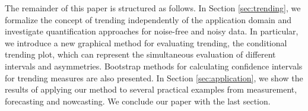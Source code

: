 The remainder of this paper is structured as follows. 
In Section \ref{sec:trending}, we formalize the concept of trending independently of the application domain and investigate quantification approaches for noise-free and noisy data. 
In particular, we introduce a new graphical method for evaluating trending, the conditional trending plot, which can represent the simultaneous evaluation of different intervals and asymmetries. 
Bootstrap methods for calculating confidence intervals for trending measures are also presented. 
In Section \ref{sec:application}, we show the results of applying our method to several practical examples from measurement, forecasting and nowcasting. 
We conclude our paper with the last section.

